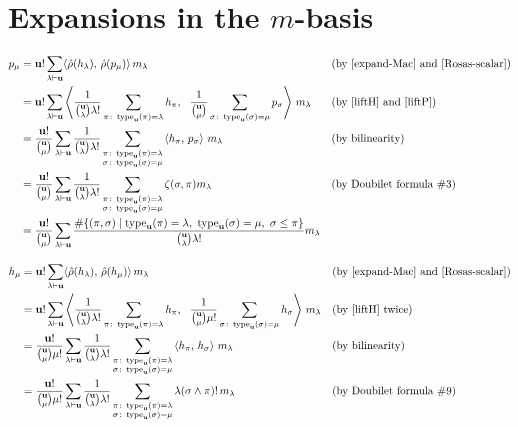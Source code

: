 \section{Expansions in the $m$-basis}

\begin{align*}
p_\mu &=  \uu! \sum_{\lambda\partn\uu} \langle \hat\rho(h_\lambda),\,\hat\rho(p_\mu)\rangle\, m_\lambda
	&&\text{(by~\eqref{expand-Mac} and~\eqref{Rosas-scalar})}\\
&=  \uu! \sum_{\lambda\partn\uu} \left\langle \frac{1}{\binom{\uu}{\lambda}\lambda!} \sum_{\pi\colon \type_\uu(\pi)=\lambda} h_\pi, \ \ \frac{1}{\binom{\uu}{\mu}} \sum_{\sigma\colon \type_\uu(\sigma)=\mu} p_\sigma \right\rangle\, m_\lambda
	&&\text{(by~\eqref{liftH} and~\eqref{liftP})}\\
&=  \frac{\uu!}{\binom{\uu}{\mu}} \sum_{\lambda\partn\uu} \frac{1}{\binom{\uu}{\lambda}\lambda!}
    \sum_{\substack{\pi\colon \type_\uu(\pi)=\lambda\\ \sigma\colon \type_\uu(\sigma)=\mu}}
    \left\langle h_\pi,\,p_\sigma \right\rangle\, m_\lambda
	&&\text{(by bilinearity)}\\
&=  \frac{\uu!}{\binom{\uu}{\mu}} \sum_{\lambda\partn\uu} \frac{1}{\binom{\uu}{\lambda}\lambda!}
    \sum_{\substack{\pi\colon \type_\uu(\pi)=\lambda\\ \sigma\colon \type_\uu(\sigma)=\mu}}
    \zeta(\sigma,\pi) m_\lambda
	&&\text{(by~Doubilet formula \#3)}\\
&=  \frac{\uu!}{\binom{\uu}{\mu}} \sum_{\lambda\partn\uu} \frac{\#\{(\pi,\sigma)\mid \type_\uu(\pi)=\lambda,\ \type_\uu(\sigma)=\mu,\ \sigma\leq\pi\}}{\binom{\uu}{\lambda}\lambda!}
    m_\lambda
\end{align*}

\begin{align*}
h_\mu &=  \mathbf{u}! \sum_{\lambda\vdash\mathbf{u}} \langle \hat\rho(h_\lambda),\,\hat\rho(h_\mu)\rangle\, m_\lambda
	&&\text{(by~\eqref{expand-Mac} and~\eqref{Rosas-scalar})}\\
&=  \mathbf{u}! \sum_{\lambda\vdash\mathbf{u}} \left\langle \frac{1}{\binom{\mathbf{u}}{\lambda}\lambda!} \sum_{\pi\colon \operatorname{type}_{\mathbf{u}}(\pi)=\lambda} h_\pi, \ \ \frac{1}{\binom{\mathbf{u}}{\mu}\mu!} \sum_{\sigma\colon \operatorname{type}_{\mathbf{u}}(\sigma)=\mu} h_\sigma \right\rangle\, m_\lambda
	&&\text{(by~\eqref{liftH} twice)}\\
&=  \frac{\mathbf{u}!}{\binom{\mathbf{u}}{\mu}\mu!} \sum_{\lambda\vdash\mathbf{u}} \frac{1}{\binom{\mathbf{u}}{\lambda}\lambda!}
    \sum_{\substack{\pi\colon \operatorname{type}_{\mathbf{u}}(\pi)=\lambda\\ \sigma\colon \operatorname{type}_{\mathbf{u}}(\sigma)=\mu}}
    \left\langle h_\pi,\,h_\sigma \right\rangle\, m_\lambda
	&&\text{(by bilinearity)}\\
&=  \frac{\mathbf{u}!}{\binom{\mathbf{u}}{\mu}\mu!} \sum_{\lambda\vdash\mathbf{u}} \frac{1}{\binom{\mathbf{u}}{\lambda}\lambda!}
    \sum_{\substack{\pi\colon \operatorname{type}_{\mathbf{u}}(\pi)=\lambda\\ \sigma\colon \operatorname{type}_{\mathbf{u}}(\sigma)=\mu}}
    \lambda(\sigma\wedge\pi)!\, m_\lambda
	&&\text{(by Doubilet formula \#9)}\\
\end{align*}

